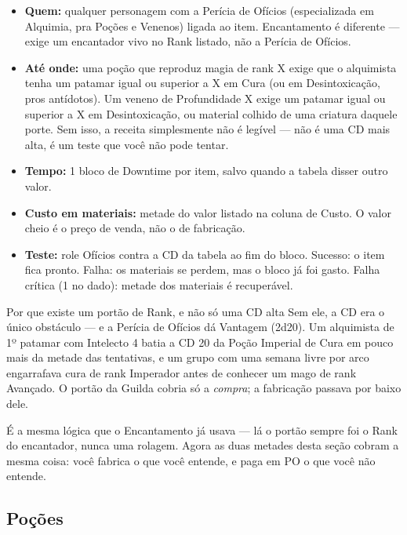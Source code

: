 \begin{itemize}
    \item \textbf{Quem:} qualquer personagem com a Perícia de Ofícios (especializada em
          Alquimia, pra Poções e Venenos) ligada ao item. Encantamento é diferente --- exige
          um encantador vivo no Rank listado, não a Perícia de Ofícios.
    \item \textbf{Até onde:} uma poção que reproduz magia de rank X exige que o alquimista
          tenha um patamar igual ou superior a X em Cura (ou em Desintoxicação, pros
          antídotos). Um veneno de Profundidade X exige um patamar igual ou superior a X em
          Desintoxicação, ou material colhido de uma criatura daquele porte. Sem isso, a
          receita simplesmente não é legível --- não é uma CD mais alta, é um teste que você
          não pode tentar.
    \item \textbf{Tempo:} 1 bloco de Downtime por item, salvo quando a tabela disser outro
          valor.
    \item \textbf{Custo em materiais:} metade do valor listado na coluna de Custo. O valor
          cheio é o preço de venda, não o de fabricação.
    \item \textbf{Teste:} role Ofícios contra a CD da tabela ao fim do bloco. Sucesso: o item
          fica pronto. Falha: os materiais se perdem, mas o bloco já foi gasto. Falha crítica
          (1 no dado): metade dos materiais é recuperável.
\end{itemize}

\begin{aviso}{Por que existe um portão de Rank, e não só uma CD alta}
    Sem ele, a CD era o único obstáculo --- e a Perícia de Ofícios dá Vantagem (2d20). Um
    alquimista de 1º patamar com Intelecto 4 batia a CD 20 da Poção Imperial de Cura em pouco
    mais da metade das tentativas, e um grupo com uma semana livre por arco engarrafava cura
    de rank Imperador antes de conhecer um mago de rank Avançado. O portão da Guilda cobria só
    a \emph{compra}; a fabricação passava por baixo dele.

    \medskip
    É a mesma lógica que o Encantamento já usava --- lá o portão sempre foi o Rank do
    encantador, nunca uma rolagem. Agora as duas metades desta seção cobram a mesma coisa:
    você fabrica o que você entende, e paga em PO o que você não entende.
\end{aviso}

\subsection{Poções}

